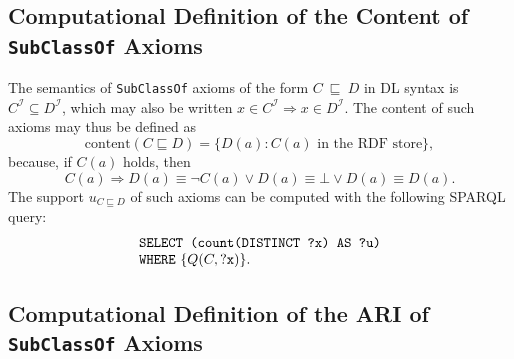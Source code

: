 \documentclass[conference]{IEEEtran}
\begin{document}
\subsection{Computational Definition of the Content of \texttt{SubClassOf} Axioms}

The semantics of \texttt{SubClassOf} axioms of the form $C~\sqsubseteq~D$ in DL syntax is $C^\mathcal{I} \subseteq D^\mathcal{I}$,
which may also be written $x \in C^\mathcal{I} \Rightarrow x \in D^\mathcal{I}$. 
The content of such axioms may thus be defined as
\begin{equation}
  \mathrm{content}(C \sqsubseteq D) = \{D(a) : \mbox{$C(a)$ in the RDF store} \},
\end{equation}
because, if $C(a)$ holds, then
\[
  C(a) \Rightarrow D(a) \equiv \neg C(a) \lor D(a) \equiv \bot \lor D(a) \equiv D(a).
\]
The support $u_{C \sqsubseteq D}$ of such axioms can be computed with the following SPARQL query:
\begin{equation}
  \begin{minipage}[c]{5in}
    \begin{tabbing}
      \quad\=\quad\=\quad\=\kill
      \texttt{SELECT (count(DISTINCT ?x) AS ?u)}\\
      \texttt{WHERE} \{$Q(C, \mbox{\tt ?x})$\}.
    \end{tabbing}
  \end{minipage}
\end{equation}

\subsection{Computational Definition of the ARI of \texttt{SubClassOf} Axioms}
\label{comp-def-ARI}
\end{document}
